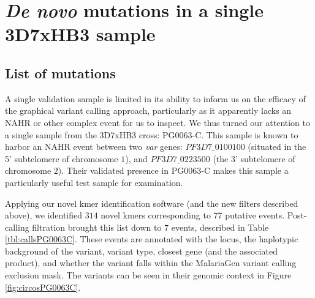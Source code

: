 \section{\textit{De novo} mutations in a single 3D7xHB3 sample}

\subsection{List of mutations}

A single validation sample is limited in its ability to inform us on the efficacy of the graphical variant calling approach, particularly as it apparently lacks an NAHR or other complex event for us to inspect.  We thus turned our attention to a single sample from the 3D7xHB3 cross: PG0063-C.  This sample is known to harbor an NAHR event between two \textit{var} genes: $PF3D7\_0100100$ (situated in the 5' subtelomere of chromosome $1$), and $PF3D7\_0223500$ (the 3' subtelomere of chromosome $2$).  Their validated presence in PG0063-C makes this sample a particularly useful test sample for examination.

Applying our novel kmer identification software (and the new filters described above), we identified $314$ novel kmers corresponding to $77$ putative events.  Post-calling filtration brought this list down to $7$ events, described in Table \ref{tbl:callsPG0063C}.  These events are annotated with the locus, the haplotypic background of the variant, variant type, closest gene (and the associated product), and whether the variant falls within the MalariaGen variant calling exclusion mask.  The variants can be seen in their genomic context in Figure \ref{fig:circosPG0063C}.  

